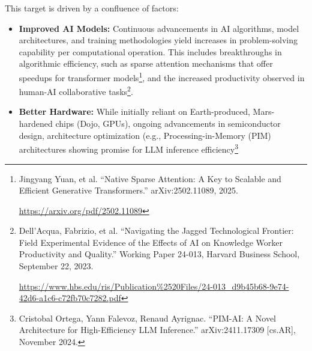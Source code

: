 \documentclass[fontsize=10pt, oneside, DIV=calc]{scrartcl}
\begin{document}
\noindent
This target is driven by a confluence of factors:
\begin{itemize}
    \item \textbf{Improved AI Models:} Continuous advancements in AI algorithms, model architectures, and training methodologies yield increases in problem-solving capability per computational operation. This includes breakthroughs in algorithmic efficiency, such as sparse attention mechanisms that offer speedups for transformer models\footnote{Jingyang Yuan, et al. ``Native Sparse Attention: A Key to Scalable and Efficient Generative Transformers.'' arXiv:2502.11089, 2025. 















\href{https://arxiv.org/pdf/2502.11089}\url{https://arxiv.org/pdf/2502.11089}}, and the increased productivity observed in human-AI collaborative tasks\footnote{Dell’Acqua, Fabrizio, et al. ``Navigating the Jagged Technological Frontier: Field Experimental Evidence of the Effects of AI on Knowledge Worker Productivity and Quality.'' Working Paper 24-013, Harvard Business School, September 22, 2023. 















\href{https://www.hbs.edu/ris/Publication\%2520Files/24-013\_d9b45b68-9e74-42d6-a1c6-c72fb70c7282.pdf}\url{https://www.hbs.edu/ris/Publication\%2520Files/24-013\_d9b45b68-9e74-42d6-a1c6-c72fb70c7282.pdf}}.
    \item \textbf{Better Hardware:} While initially reliant on Earth-produced, Mars-hardened chips (Dojo, GPUs), ongoing advancements in semiconductor design, architecture optimization (e.g., Processing-in-Memory (PIM) architectures showing promise for LLM inference efficiency\footnote{Cristobal Ortega, Yann Falevoz, Renaud Ayrignac. ``PIM-AI: A Novel Architecture for High-Efficiency LLM Inference.'' arXiv:2411.17309 [cs.AR], November 2024. 















}
\end{itemize}
\end{document}
